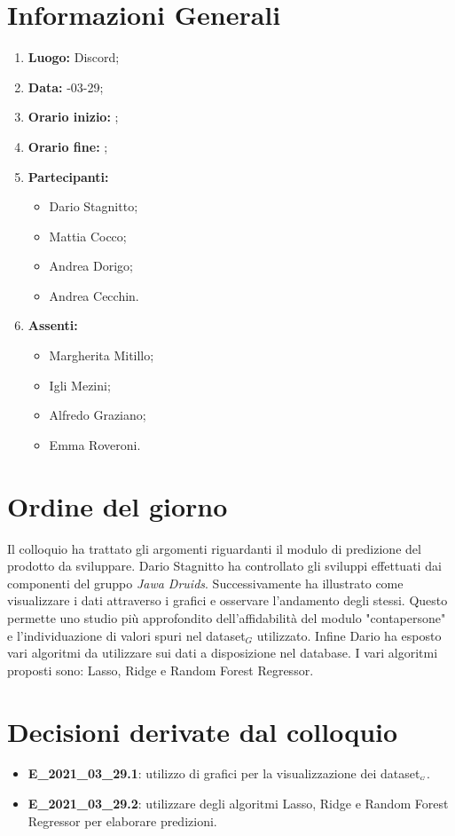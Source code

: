 \newpage
\section{Informazioni Generali}
\begin{enumerate}
	\item \textbf{Luogo:} \normalfont Discord;
	\item \textbf{Data:} -03-29;
	\item \textbf{Orario inizio:} ;
	\item \textbf{Orario fine:} ;
	\item \textbf{Partecipanti:}
	\begin{itemize}
		\item Dario Stagnitto;
		\item Mattia Cocco;
		\item Andrea Dorigo;
		\item Andrea Cecchin.
	\end{itemize}
	\item \textbf{Assenti:}
	\begin{itemize}
		\item Margherita Mitillo;
		\item Igli Mezini;
		\item Alfredo Graziano;
		\item Emma Roveroni.
	\end{itemize}
\end{enumerate}
\section{Ordine del giorno}
Il colloquio ha trattato gli argomenti riguardanti il modulo di predizione del prodotto da sviluppare. Dario Stagnitto ha controllato gli sviluppi effettuati dai componenti del gruppo \textit{Jawa Druids}. Successivamente ha illustrato come visualizzare i dati attraverso i grafici e osservare l'andamento degli stessi. Questo permette uno studio più approfondito dell'affidabilità del modulo "contapersone" e l'individuazione di valori spuri nel dataset$_G$ utilizzato.
Infine Dario ha esposto vari algoritmi da utilizzare sui dati a disposizione nel database. I vari algoritmi proposti sono: Lasso, Ridge e Random Forest Regressor.
\section{Decisioni derivate dal colloquio}
\begin{itemize}
	\item \textbf{E\_2021\_03\_29.1}: utilizzo di grafici per la visualizzazione dei dataset$_{\scaleto{G}{3pt}}$.
	\item \textbf{E\_2021\_03\_29.2}: utilizzare degli algoritmi Lasso, Ridge e Random Forest Regressor per elaborare predizioni.
\end{itemize}